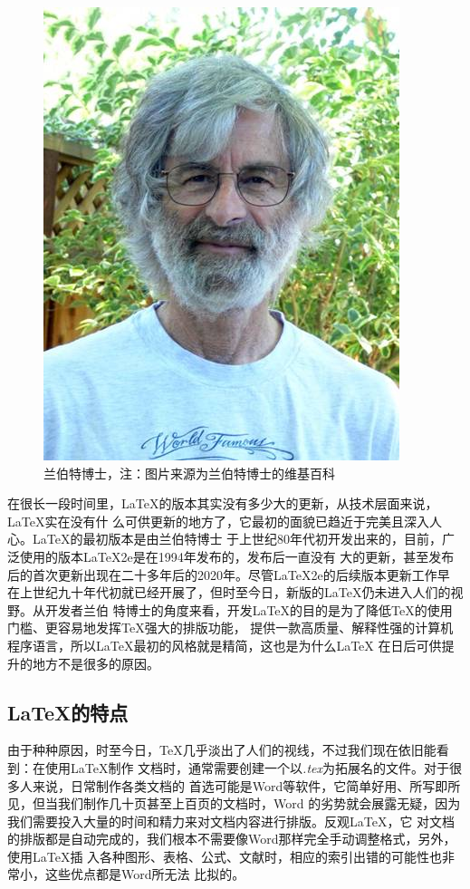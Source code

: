 \begin{figure}
    \centering
    \includegraphics[scale=0.6]{images/Leslie_Lamport.jpeg}
    \caption{兰伯特博士，注：图片来源为兰伯特博士的维基百科}
\end{figure}

在很长一段时间里，LaTeX的版本其实没有多少大的更新，从技术层面来说，LaTeX实在没有什
么可供更新的地方了，它最初的面貌已趋近于完美且深入人心。LaTeX的最初版本是由兰伯特博士
于上世纪80年代初开发出来的，目前，广泛使用的版本LaTeX2e是在1994年发布的，发布后一直没有
大的更新，甚至发布后的首次更新出现在二十多年后的2020年。尽管LaTeX2e的后续版本更新工作早
在上世纪九十年代初就已经开展了，但时至今日，新版的LaTeX仍未进入人们的视野。从开发者兰伯
特博士的角度来看，开发LaTeX的目的是为了降低TeX的使用门槛、更容易地发挥TeX强大的排版功能，
提供一款高质量、解释性强的计算机程序语言，所以LaTeX最初的风格就是精简，这也是为什么LaTeX
在日后可供提升的地方不是很多的原因。

\subsection{\LaTeX 的特点}
由于种种原因，时至今日，TeX几乎淡出了人们的视线，不过我们现在依旧能看到：在使用LaTeX制作
文档时，通常需要创建一个以\emph{.tex}为拓展名的文件。对于很多人来说，日常制作各类文档的
首选可能是Word等软件，它简单好用、所写即所见，但当我们制作几十页甚至上百页的文档时，Word
的劣势就会展露无疑，因为我们需要投入大量的时间和精力来对文档内容进行排版。反观LaTeX，它
对文档的排版都是自动完成的，我们根本不需要像Word那样完全手动调整格式，另外，使用LaTeX插
入各种图形、表格、公式、文献时，相应的索引出错的可能性也非常小，这些优点都是Word所无法
比拟的。

